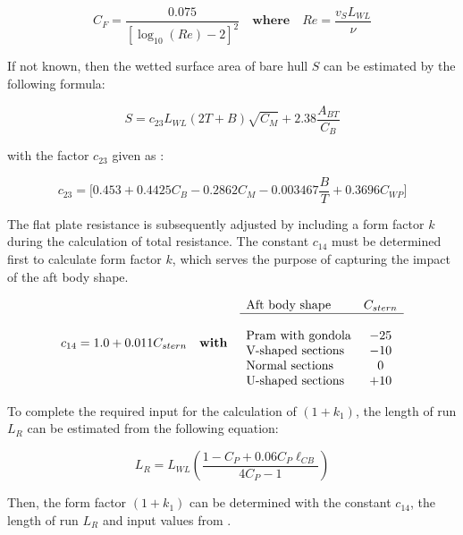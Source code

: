 \begin{equation}\label{eqn: C_F}
    C_F = \frac{0.075}{[\log_{10}(Re)-2]^2} \quad \textbf{where} \quad Re = \frac{v_{S}L_{WL}}{\nu}
\end{equation}

If not known, then the wetted surface area of bare hull $S$ can be estimated by the following formula:

\begin{equation}\label{eqn:S_bh}
    S = c_{23}L_{WL}(2T+B)\sqrt{C_M}+2.38\frac{A_{BT}}{C_B}
\end{equation}

with the factor $c_{23}$ given as :

\begin{equation}\label{eqn:c_23}
    c_{23} = \biggl[0.453 + 0.4425C_B - 0.2862C_M - 0.003467\frac{B}{T} + 0.3696C_{WP} \biggr]
\end{equation}

The flat plate resistance is subsequently adjusted by including a form factor $k$ during the calculation of total resistance. The constant $c_{14}$ must be determined first to calculate form factor $k$, which serves the purpose of capturing the impact of the aft body shape.   

\begin{equation}\label{eqn:c_14}
    c_{14} = 1.0 + 0.011C_{stern} \quad \textbf{with} \quad \begin{array}{l c}
        \text{Aft body shape} & C_{stern}\\
        \hline\\
        \text{Pram with gondola} & -25 \\
        \text{V-shaped sections} & -10 \\
        \text{Normal sections} & 0 \\
        \text{U-shaped sections} & +10 \\
    \end{array}
\end{equation}

To complete the required input for the calculation of $(1+k_1)$, the length of run $L_R$ can be estimated from the following equation:

\begin{equation}\label{eqn:L_R}
    L_R = L_{WL}(\frac{1-C_P+0.06C_P\ell_{CB}}{4C_P-1})
\end{equation}

Then, the form factor $(1+k_1)$ can be determined with the constant $c_{14}$, the length of run $L_R$ and input values from .

